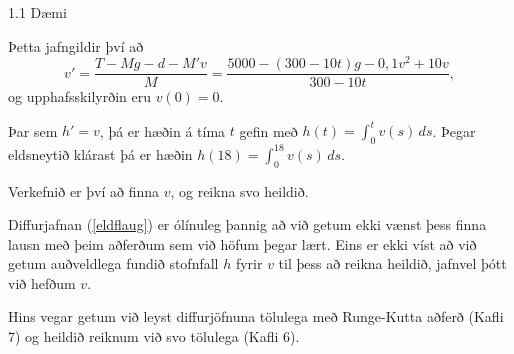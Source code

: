 \begin{frame}{1.1 Dæmi}

\begin{block}{}
Þetta jafngildir því að 
\begin{equation}
v' = \frac{T-Mg-d-M'v}{M} = \frac{5000-(300-10t)g-0,1v^2+10v}{300-10t},
\label{eldflaug}
\end{equation}\pause
og upphafsskilyrðin eru $v(0) =0$.

\pause\smallskip
Þar sem $h' = v$, \pause þá er hæðin á tíma $t$ gefin með 
$h(t) =\int_0^t v(s)\, ds$. \pause 
Þegar eldsneytið klárast þá er hæðin $h(18) = \int_0^{18} v(s)\, ds$.

\pause\smallskip
Verkefnið er því að finna $v$, og reikna svo heildið.

\pause\smallskip
Diffurjafnan (\ref{eldflaug}) er ólínuleg þannig að við getum ekki vænst þess 
finna lausn með þeim aðferðum sem við höfum þegar lært. 
Eins er ekki víst að við getum auðveldlega fundið stofnfall $h$ fyrir
$v$ til þess að reikna heildið, jafnvel þótt við hefðum $v$.

\pause\smallskip
Hins vegar getum við leyst diffurjöfnuna tölulega með Runge-Kutta aðferð (Kafli 7)
og heildið reiknum við svo tölulega (Kafli 6).
 \end{block}

\end{frame}


% 
% 
% 


%

